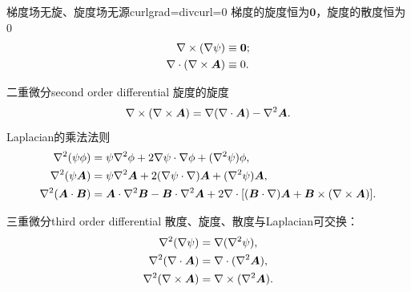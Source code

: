 \begin{theorem}
    {梯度场无旋、旋度场无源}{curlgrad=divcurl=0}
    梯度的旋度恒为$\bm0$，旋度的散度恒为0
    \begin{align}
        \label{eqn:curlgrad}
        \nabla\times(\nabla\psi) &\equiv \bm 0;\\
        \label{eqn:divcurl}
        \nabla\cdot(\nabla\times\bm A) &\equiv 0.
    \end{align}
\end{theorem}

\begin{theorem}
    {二重微分}{second order differential}
    旋度的旋度
    \begin{equation}
        \label{eqn:curlcurl}
        \nabla\times(\nabla\times\bm A) = \nabla(\nabla\cdot\bm A) - \nabla^2\bm A.
    \end{equation}
    Laplacian的乘法法则
    \begin{align}
        \nabla^2(\psi\phi) &= \psi\nabla^2\phi + 2\nabla\psi \cdot \nabla\phi + (\nabla^2\psi)\phi,\\
        \nabla^2(\psi\bm A) &= \psi\nabla^2\bm A + 2(\nabla\psi \cdot \nabla)\bm A + (\nabla^2\psi)\bm A,\\
        \nabla^2(\bm A \cdot \bm B) &= \bm A \cdot \nabla^2\bm B - \bm B \cdot \nabla^2\bm A + 2\nabla\cdot[(\bm B \cdot \nabla)\bm A + \bm B \times (\nabla\times\bm A)].
    \end{align}
\end{theorem}

\begin{theorem}
    {三重微分}{third order differential}
    散度、旋度、散度与Laplacian可交换：
    \begin{align}
        \nabla^2(\nabla\psi) &= \nabla(\nabla^2\psi),\\
        \nabla^2(\nabla\cdot\bm A) &= \nabla\cdot(\nabla^2\bm A),\\
        \nabla^2(\nabla\times\bm A) &= \nabla\times(\nabla^2\bm A).
    \end{align}
\end{theorem}


